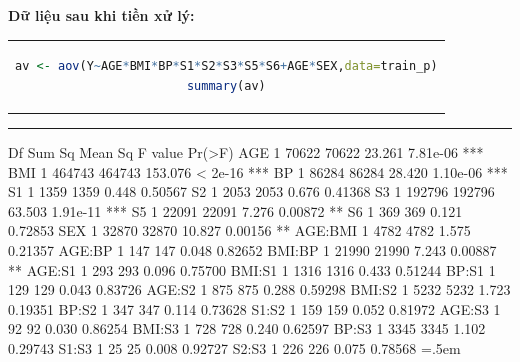 \documentclass[runningheads]{llncs}
\newenvironment{lcverbatim}
 {\SaveVerbatim{cverb}}
 {\endSaveVerbatim
  \flushleft\fboxrule=0pt\fboxsep=.5em
  \colorbox{cverbbg}{%
    \makebox[\dimexpr\linewidth-2\fboxsep][l]{\BUseVerbatim{cverb}}%
  }
  \endflushleft
}
\begin{document}
\textbf{Dữ liệu sau khi tiền xử lý:}
\begin{center}
\begin{tabular}{c}
\begin{lstlisting}[language=R]
av <- aov(Y~AGE*BMI*BP*S1*S2*S3*S5*S6+AGE*SEX,data=train_p)
summary(av)
\end{lstlisting}
\end{tabular}
\end{center}
\hrule
\begin{lcverbatim}
                       Df Sum Sq Mean Sq F value   Pr(>F)    
AGE                     1  70622   70622  23.261 7.81e-06 ***
BMI                     1 464743  464743 153.076  < 2e-16 ***
BP                      1  86284   86284  28.420 1.10e-06 ***
S1                      1   1359    1359   0.448  0.50567    
S2                      1   2053    2053   0.676  0.41368    
S3                      1 192796  192796  63.503 1.91e-11 ***
S5                      1  22091   22091   7.276  0.00872 ** 
S6                      1    369     369   0.121  0.72853    
SEX                     1  32870   32870  10.827  0.00156 ** 
AGE:BMI                 1   4782    4782   1.575  0.21357    
AGE:BP                  1    147     147   0.048  0.82652    
BMI:BP                  1  21990   21990   7.243  0.00887 ** 
AGE:S1                  1    293     293   0.096  0.75700    
BMI:S1                  1   1316    1316   0.433  0.51244    
BP:S1                   1    129     129   0.043  0.83726    
AGE:S2                  1    875     875   0.288  0.59298    
BMI:S2                  1   5232    5232   1.723  0.19351    
BP:S2                   1    347     347   0.114  0.73628    
S1:S2                   1    159     159   0.052  0.81972    
AGE:S3                  1     92      92   0.030  0.86254    
BMI:S3                  1    728     728   0.240  0.62597    
BP:S3                   1   3345    3345   1.102  0.29743    
S1:S3                   1     25      25   0.008  0.92727    
S2:S3                   1    226     226   0.075  0.78568    
\end{lcverbatim}
\end{document}
